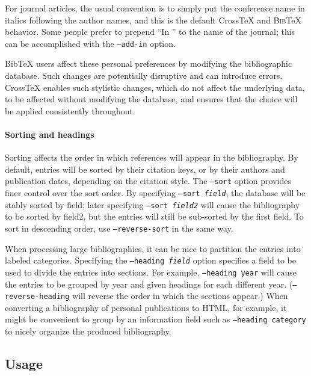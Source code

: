 \documentclass{article}
\newcommand{\XTeX}{Cross\TeX}
\newcommand{\BibTeX}{\textsc{Bib}\TeX}
\begin{document}
For journal articles, the usual convention is to simply put the 
conference name in italics following the author names, and this is
the default \XTeX{} and \BibTeX{} behavior. Some people prefer to prepend
``In '' to the name of the journal; this can be accomplished with the 
\texttt{--add-in} option.

BibTeX users affect these personal preferences by modifying the bibliographic
database. Such changes are potentially disruptive and can introduce errors. 
\XTeX{} enables such stylistic changes, which do not affect the underlying data, 
to be affected without modifying the database, and ensures that the choice will
be applied consistently throughout.

\paragraph{Sorting and headings}

Sorting affects the order in which references will appear in the bibliography.
By default, entries will be sorted by their citation keys, or by their
authors and publication dates, depending on the citation style. 
The \texttt{--sort} option provides
finer control over the sort order. By specifying \texttt{--sort
\textrm{\textit{field}}}, the database will be stably sorted by field;
later specifying \texttt{--sort \textrm{\textit{field2}}} will cause
the bibliography to be sorted by field2, but the entries will still be
sub-sorted by the first field. To sort in descending order, 
use \texttt{--reverse-sort} in the same way.

When processing large bibliographies, it can be nice to partition the entries into labeled categories. Specifying the \texttt{--heading \textrm{\textit{field}}} option specifies a field to be used to divide the entries into sections. For example, \texttt{--heading year} will cause the entries to be grouped by year and given headings for each different year. (\texttt{--reverse-heading} will reverse the order in which the sections appear.) When converting a bibliography of personal publications to HTML, for example, it might be convenient to group by an information field such as \texttt{--heading category} to nicely organize the produced bibliography.

\subsection{Usage}
\end{document}
